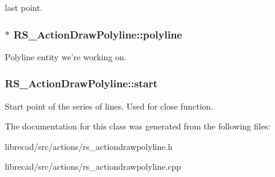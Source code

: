 last point. \hypertarget{classRS__ActionDrawPolyline_a0cd87f49ebb92313d3c1f36e07b9018f}{
\subsubsection[{polyline}]{$\ast$ R\-S\-\_\-\-Action\-Draw\-Polyline\-::polyline\hspace{0.3cm}{\ttfamily [protected]}}}\label{classRS__ActionDrawPolyline_a0cd87f49ebb92313d3c1f36e07b9018f}
Polyline entity we're working on. \hypertarget{classRS__ActionDrawPolyline_a950fb9523df15cdc97402d5c50dd1e5f}{
\subsubsection[{start}]{ R\-S\-\_\-\-Action\-Draw\-Polyline\-::start\hspace{0.3cm}{\ttfamily [protected]}}}\label{classRS__ActionDrawPolyline_a950fb9523df15cdc97402d5c50dd1e5f}
Start point of the series of lines. Used for close function. 

The documentation for this class was generated from the following files\-:\begin{DoxyCompactItemize}
\item 
librecad/src/actions/rs\-\_\-actiondrawpolyline.\-h\item 
librecad/src/actions/rs\-\_\-actiondrawpolyline.\-cpp\end{DoxyCompactItemize}
